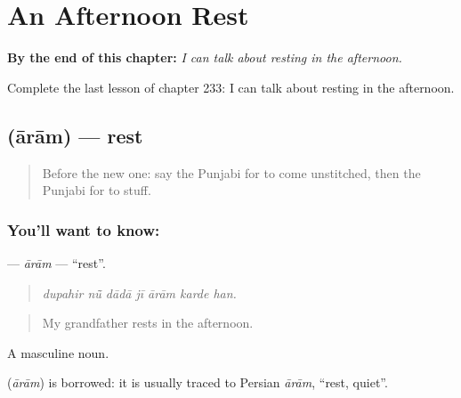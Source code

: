 
\chapter{An Afternoon Rest}
\label{ch:pa-a2-an-afternoon-rest}

\begin{chapteropening}
\textbf{By the end of this chapter:} \emph{I can talk about resting in the afternoon.}

Complete the last lesson of chapter 233: I can talk about resting in the afternoon.
\end{chapteropening}

\section[\texorpdfstring{\pa{ਆਰਾਮ} (ārām)}{ਆਰਾਮ (ārām)}]{ (ārām) — rest}

\label{lesson:PA-C233-aram}



\begin{quote}
Before the new one: say the Punjabi for to come unstitched, then the Punjabi for to stuff.
\end{quote}

\subsection*{You'll want to know: }
\textbf{} — \emph{ārām} — \textquotedblleft{}rest\textquotedblright{}.

\begin{quote}
      
\end{quote}

\begin{quote}
\emph{dupahir nū̃ dādā jī ārām karde han.}
\end{quote}

\begin{quote}
My grandfather rests in the afternoon.
\end{quote}

A masculine noun.

\begin{cousinweb}
\textbf{} (\emph{ārām}) is borrowed: it is usually traced to Persian \emph{ārām}, \textquotedblleft{}rest, quiet\textquotedblright{}.
\end{cousinweb}

